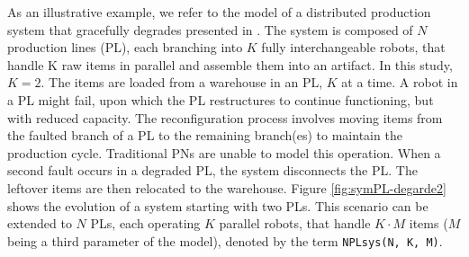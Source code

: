 As an illustrative example, we refer to the model of a distributed production system that gracefully degrades presented in \cite{CAPRA-TCS2024}. The system is composed of $N$ production lines (PL), each branching into $K$ fully interchangeable robots, that handle K raw items in parallel 
and assemble them into an artifact. In this study, $K = 2$. The items are loaded from a warehouse in an PL, $K$ at a time. 
A robot in a PL might fail, upon which
the PL restructures to continue functioning, but with reduced capacity.
The reconfiguration process involves moving items from the faulted branch of a PL to the remaining branch(es) to maintain the production cycle. Traditional PNs
are unable to model this operation. 
When a second fault occurs in a degraded PL, the system disconnects the PL. The leftover items are then relocated to the warehouse.
Figure \ref{fig:symPL-degarde2} shows the evolution of a system starting with two PLs. This scenario can be extended to $N$ PLs, each operating $K$ parallel robots,
that handle $K \cdot M$ items ($M$ being a third parameter of the model), 
denoted by the term \verb|NPLsys(N, K, M)|. 
